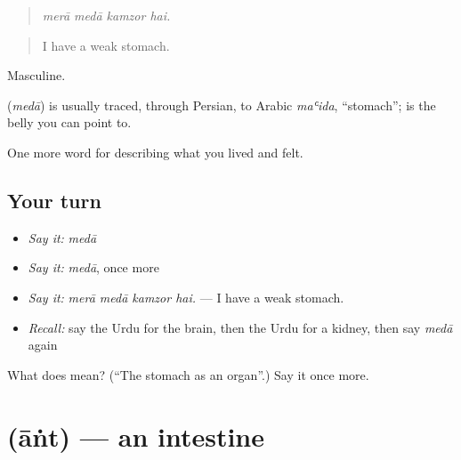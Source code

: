 \begin{quote}
   
\end{quote}

\begin{quote}
\emph{merā medā kamzor hai.}
\end{quote}

\begin{quote}
I have a weak stomach.
\end{quote}

Masculine.

\begin{cousinweb}
\textbf{} (\emph{medā}) is usually traced, through Persian, to Arabic \emph{maʿida}, \textquotedblleft{}stomach\textquotedblright{}; \textbf{} is the belly you can point to.
\end{cousinweb}

\begin{grammarlens}[title={What you've built}]
One more word for describing what you lived and felt.
\end{grammarlens}

\subsection*{Your turn}
\begin{itemize}
\raggedright
  \item \emph{Say it:} \emph{medā}
  \item \emph{Say it:} \emph{medā}, once more
  \item \emph{Say it:} \emph{merā medā kamzor hai.} — I have a weak stomach.
  \item \emph{Recall:} say the Urdu for the brain, then the Urdu for a kidney, then say \emph{medā} again
\end{itemize}

\begin{tcolorbox}[breakable,colback=teal!4,colframe=teal!35!black,title={Before you move on}]
What does  mean? (\textquotedblleft{}The stomach as an organ\textquotedblright{}.) Say it once more.
\end{tcolorbox}
\section[\texorpdfstring{\ur{آنت} (āṅt)}{آنت (āṅt)}]{ (āṅt) — an intestine}

\label{lesson:UR-C464-ant}



